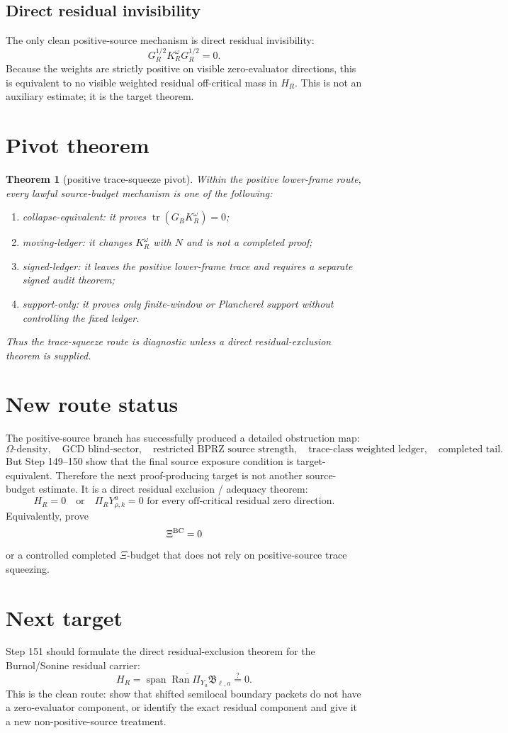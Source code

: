 \documentclass[11pt]{article}
\newtheorem{theorem}{Theorem}
\begin{document}
\subsection{Direct residual invisibility}
The only clean positive-source mechanism is direct residual invisibility:
\[
  G_R^{1/2}K_R^\omega G_R^{1/2}=0.
\]
Because the weights are strictly positive on visible zero-evaluator directions, this is equivalent to no visible weighted residual off-critical mass in \(H_R\).  This is not an auxiliary estimate; it is the target theorem.

\section{Pivot theorem}
\begin{theorem}[positive trace-squeeze pivot]
Within the positive lower-frame route, every lawful source-budget mechanism is one of the following:
\begin{enumerate}[label=(\roman*)]
  \item collapse-equivalent: it proves \(\operatorname{tr}(G_RK_R^\omega)=0\);
  \item moving-ledger: it changes \(K_R^\omega\) with \(N\) and is not a completed proof;
  \item signed-ledger: it leaves the positive lower-frame trace and requires a separate signed audit theorem;
  \item support-only: it proves only finite-window or Plancherel support without controlling the fixed ledger.
\end{enumerate}
Thus the trace-squeeze route is diagnostic unless a direct residual-exclusion theorem is supplied.
\end{theorem}

\section{New route status}
The positive-source branch has successfully produced a detailed obstruction map:
\[
\Omega\text{-density},\quad
\text{GCD blind-sector},\quad
\text{restricted BPRZ source strength},\quad
\text{trace-class weighted ledger},\quad
\text{completed tail}.
\]
But Step 149--150 show that the final source exposure condition is target-equivalent.  Therefore the next proof-producing target is not another source-budget estimate.  It is a direct residual exclusion / adequacy theorem:
\[
  H_R=0
  \quad\text{or}\quad
  \Pi_RY^a_{\rho,k}=0\text{ for every off-critical residual zero direction.}
\]
Equivalently, prove
\[
  \Xi^{\rm BC}=0
\]
or a controlled completed \(\Xi\)-budget that does not rely on positive-source trace squeezing.

\section{Next target}
Step 151 should formulate the direct residual-exclusion theorem for the Burnol/Sonine residual carrier:
\[
  H_R=\overline{\operatorname{span}\operatorname{Ran}\Pi_{Y_a}\mathfrak B_{\ell,a}}
  \stackrel{?}{=}0.
\]
This is the clean route: show that shifted semilocal boundary packets do not have a zero-evaluator component, or identify the exact residual component and give it a new non-positive-source treatment.
\end{document}
